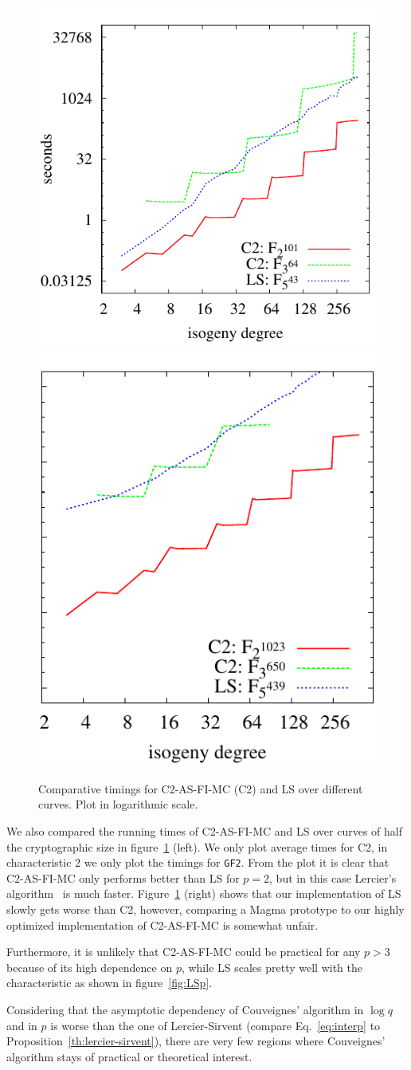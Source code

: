 \begin{figure}
  \centering
  \includegraphics[height=0.45\textwidth]{isogeny/C2-LS}
  \includegraphics[height=0.45\textwidth]{isogeny/C2-LS2}
   \caption{Comparative timings for C2-AS-FI-MC (C2) and LS over
     different curves. Plot in logarithmic scale.}
  \label{fig:comp}
\end{figure}

We also compared the running times of C2-AS-FI-MC and LS over curves
of half the cryptographic size in figure~\ref{fig:comp} (left). We
only plot average times for C2, in characteristic $2$ we only plot the
timings for \texttt{GF2}. From the plot it is clear that C2-AS-FI-MC
only performs better than LS for $p=2$, but in this case Lercier's
algorithm~\cite{lercier96} is much faster.  Figure~\ref{fig:comp}
(right) shows that our implementation of LS slowly gets worse than C2,
however, comparing a Magma prototype to our highly optimized
implementation of C2-AS-FI-MC is somewhat unfair.

Furthermore, it is unlikely that C2-AS-FI-MC could be
practical for any $p>3$ because of its high dependence on $p$, while
LS scales pretty well with the characteristic as shown in
figure~\ref{fig:LSp}.

Considering that the asymptotic dependency of Couveignes' algorithm in
$\log q$ and in $p$ is worse than the one of Lercier-Sirvent (compare
Eq.~\eqref{eq:interp} to Proposition~\ref{th:lercier-sirvent}), there
are very few regions where Couveignes' algorithm stays of practical or
theoretical interest.

